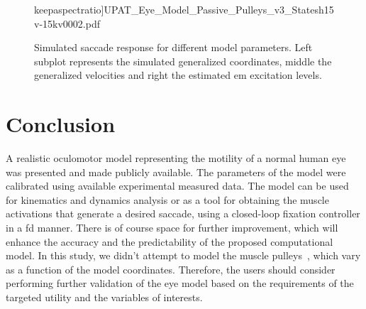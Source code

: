 \documentclass[11pt,a4paper,draft=false]{report}
\begin{document}
\begin{figure}[ht]
{    keepaspectratio]{UPAT_Eye_Model_Passive_Pulleys_v3_Statesh15v-15kv0002.pdf}\label{fig:simulated-saccade-d}}
  \caption{Simulated saccade response for different model parameters. Left
    subplot represents the simulated generalized coordinates, middle the
    generalized velocities and right the estimated \gls{em} excitation
    levels.}\label{fig:simulated-saccade}
\end{figure}

\section*{Conclusion}\label{sec:concluison}

A realistic oculomotor model representing the motility of a normal human eye was
presented and made publicly available. The parameters of the model were
calibrated using available experimental measured data. The model can be used for
kinematics and dynamics analysis or as a tool for obtaining the muscle
activations that generate a desired saccade, using a closed-loop fixation
controller in a \gls{fd} manner. There is of course space for further
improvement, which will enhance the accuracy and the predictability of the
proposed computational model. In this study, we didn't attempt to model the
muscle pulleys~\cite{Kono2002a}, which vary as a function of the model
coordinates. Therefore, the users should consider performing further validation
of the eye model based on the requirements of the targeted utility and the
variables of interests.




\end{document}
